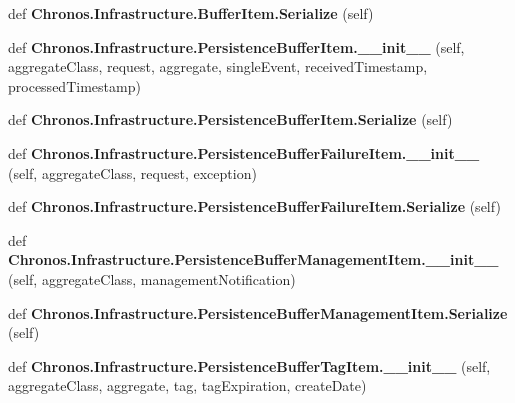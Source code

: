 \begin{DoxyCompactItemize}
\item 
def {\bfseries Chronos.\+Infrastructure.\+Buffer\+Item.\+Serialize} (self)\hypertarget{group__Chronos_ga7d93fe928cc548d9c2d66159eb6a82ce}{}\label{group__Chronos_ga7d93fe928cc548d9c2d66159eb6a82ce}

\item 
def {\bfseries Chronos.\+Infrastructure.\+Persistence\+Buffer\+Item.\+\_\+\+\_\+init\+\_\+\+\_\+} (self, aggregate\+Class, request, aggregate, single\+Event, received\+Timestamp, processed\+Timestamp)\hypertarget{group__Chronos_ga00df9046a1245279732ca84e01fdc5d8}{}\label{group__Chronos_ga00df9046a1245279732ca84e01fdc5d8}

\item 
def {\bfseries Chronos.\+Infrastructure.\+Persistence\+Buffer\+Item.\+Serialize} (self)\hypertarget{group__Chronos_ga05cf3ee5dc1d9851a2b550528a5ce3d3}{}\label{group__Chronos_ga05cf3ee5dc1d9851a2b550528a5ce3d3}

\item 
def {\bfseries Chronos.\+Infrastructure.\+Persistence\+Buffer\+Failure\+Item.\+\_\+\+\_\+init\+\_\+\+\_\+} (self, aggregate\+Class, request, exception)\hypertarget{group__Chronos_ga3390140709572444c05a26fb0e22993a}{}\label{group__Chronos_ga3390140709572444c05a26fb0e22993a}

\item 
def {\bfseries Chronos.\+Infrastructure.\+Persistence\+Buffer\+Failure\+Item.\+Serialize} (self)\hypertarget{group__Chronos_gae6dfe28263978f34bddc0b26d523e7db}{}\label{group__Chronos_gae6dfe28263978f34bddc0b26d523e7db}

\item 
def {\bfseries Chronos.\+Infrastructure.\+Persistence\+Buffer\+Management\+Item.\+\_\+\+\_\+init\+\_\+\+\_\+} (self, aggregate\+Class, management\+Notification)\hypertarget{group__Chronos_ga0d3be6bf887488eef76ce27210530428}{}\label{group__Chronos_ga0d3be6bf887488eef76ce27210530428}

\item 
def {\bfseries Chronos.\+Infrastructure.\+Persistence\+Buffer\+Management\+Item.\+Serialize} (self)\hypertarget{group__Chronos_ga6a5237b90cb1b6cecfb503e878b88a7d}{}\label{group__Chronos_ga6a5237b90cb1b6cecfb503e878b88a7d}

\item 
def {\bfseries Chronos.\+Infrastructure.\+Persistence\+Buffer\+Tag\+Item.\+\_\+\+\_\+init\+\_\+\+\_\+} (self, aggregate\+Class, aggregate, tag, tag\+Expiration, create\+Date)\hypertarget{group__Chronos_gaa486fea067f0ad08303dca6d5af2db6b}{}\label{group__Chronos_gaa486fea067f0ad08303dca6d5af2db6b}


\end{DoxyCompactItemize}
